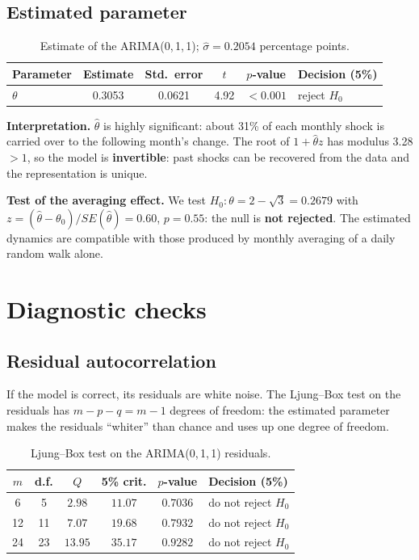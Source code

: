 \documentclass[11pt,a4paper]{article}
\begin{document}
\subsection{Estimated parameter}

\begin{table}[H]
\centering
\begin{tabular}{lccccl}
\toprule
Parameter & Estimate & Std.\ error & $t$ & $p$-value & Decision (5\%) \\
\midrule
$\theta$ & 0.3053 & 0.0621 & 4.92 & $< 0.001$ & reject $H_0$ \\
\bottomrule
\end{tabular}
\caption{Estimate of the ARIMA(0,\,1,\,1); $\hat\sigma = 0.2054$ percentage points.}
\end{table}

\textbf{Interpretation.} $\hat\theta$ is highly significant: about 31\% of each monthly shock is carried over to the following month's change. The root of $1 + \hat\theta z$ has modulus 3.28 $> 1$, so the model is \textbf{invertible}: past shocks can be recovered from the data and the representation is unique.

\textbf{Test of the averaging effect.} We test $H_0: \theta = 2 - \sqrt3 = 0.2679$ with $z = (\hat\theta - \theta_0)/SE(\hat\theta) = 0.60$, $p = 0.55$: the null is \textbf{not rejected}. The estimated dynamics are compatible with those produced by monthly averaging of a daily random walk alone.

\section{Diagnostic checks}

\subsection{Residual autocorrelation}

If the model is correct, its residuals are white noise. The Ljung--Box test on the residuals has $m - p - q = m - 1$ degrees of freedom: the estimated parameter makes the residuals ``whiter'' than chance and uses up one degree of freedom.

\begin{table}[H]
\centering
\begin{tabular}{cccccl}
\toprule
$m$ & d.f. & $Q$ & 5\% crit. & $p$-value & Decision (5\%) \\
\midrule
6 & 5 & $2.98$ & $11.07$ & $0.7036$ & do not reject $H_0$ \\
12 & 11 & $7.07$ & $19.68$ & $0.7932$ & do not reject $H_0$ \\
24 & 23 & $13.95$ & $35.17$ & $0.9282$ & do not reject $H_0$ \\
\bottomrule
\end{tabular}
\caption{Ljung--Box test on the ARIMA(0,\,1,\,1) residuals.}
\end{table}
\end{document}
